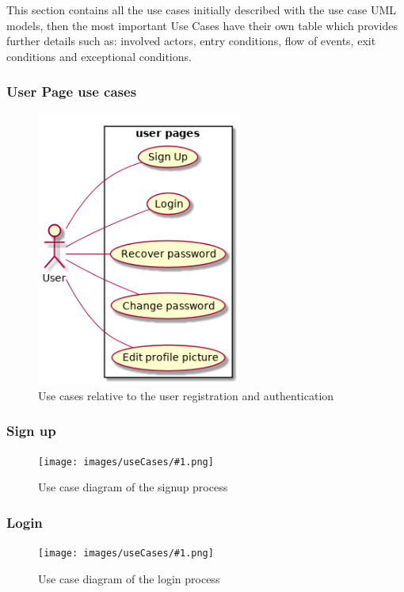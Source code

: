 \newcommand{\usecasefigure}[2]{
	\begin{figure}[htp]
		\centering
		\texttt{[image: images/useCases/\#1.png]}
		\caption{Use case diagram #2}
		\label{fig:use_cases_#1}
	\end{figure}
	\newpage
}

This section contains all the use cases initially described with the use case UML models, then the most important Use Cases have their own table which provides further details such as: involved actors, entry conditions, flow of events,  exit conditions and exceptional conditions.

\subsubsection{User Page use cases}
\begin{figure}[htp]
	\centering
	\includegraphics[width=0.6\textwidth]{images/useCases/uc_user_page.png}
	\caption{Use cases relative to the user registration and authentication} 
	\label{fig:userpage} 
\end{figure} 

\newpage
\subsubsection{Sign up}

\newpage
\usecasefigure{sign_up}{of the signup process}
\subsubsection{Login}

\newpage
\usecasefigure{login}{of the login process}
